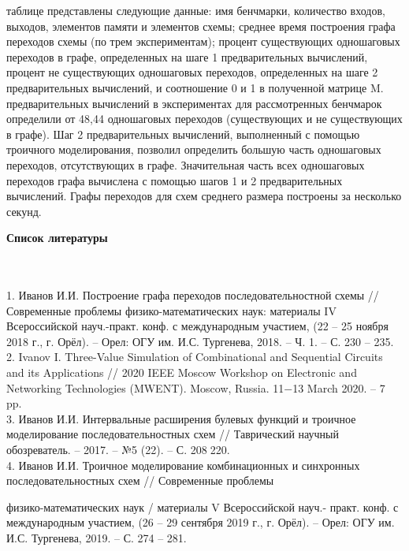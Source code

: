\documentclass[13pt]{article}
\begin{document}
\begin{Large}
 таблице представлены следующие данные: имя бенчмарки, 
количество входов, выходов, элементов памяти и элементов схемы; 
среднее время построения графа переходов схемы (по трем 
экспериментам); процент существующих одношаговых переходов в 
графе, определенных на шаге 1 предварительных вычислений, 
процент не существующих одношаговых переходов, определенных на 
шаге 2 предварительных вычислений, и соотношение 0 и 1 в 
полученной матрице M.
 предварительных вычислений в экспериментах для
рассмотренных бенчмарок определили от 48,44%
одношаговых переходов (существующих и не существующих в 
графе). Шаг 2 предварительных вычислений, выполненный с 
помощью троичного моделирования, позволил определить большую 
часть одношаговых переходов, отсутствующих в графе. Значительная 
часть всех одношаговых переходов графа вычислена с помощью 
шагов 1 и 2 предварительных вычислений. Графы переходов для схем 
среднего размера построены за несколько секунд.
\begin{center}
  \textbf{Список литературы}
\end{center} 
\\
\\1. Иванов И.И. Построение графа переходов последовательностной 
схемы // Современные проблемы физико-математических наук: 
материалы IV Всероссийской науч.-практ. конф. с международным 
участием, (22 – 25 ноября 2018 г., г. Орёл). – Орел: ОГУ им. И.С. 
Тургенева, 2018. – Ч. 1. – С. 230 – 235. 
\\2. Ivanov I. Three-Value Simulation of Combinational and Sequential
Circuits and its Applications // 2020 IEEE Moscow Workshop on 
Electronic and Networking Technologies (MWENT). Moscow, Russia. 
11−13 March 2020. – 7 pp.
\\3. Иванов И.И. Интервальные расширения булевых функций и 
троичное моделирование последовательностных схем // Таврический 
научный обозреватель. – 2017. – №5 (22). – С. 208220.
\\4. Иванов И.И. Троичное моделирование комбинационных и 
синхронных последовательностных схем // Современные проблемы 
\newpage

физико-математических наук / материалы V Всероссийской науч.-
практ. конф. с международным участием, (26 – 29 сентября 2019 г., г. 
Орёл). – Орел: ОГУ им. И.С. Тургенева, 2019. – С. 274 – 281.
\end{Large}
\end{document}
